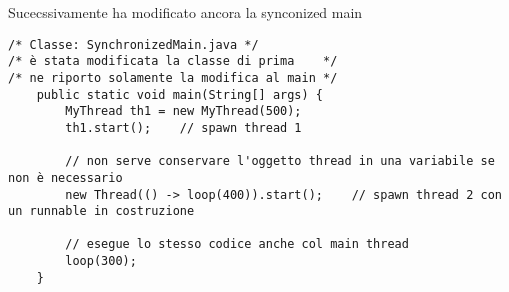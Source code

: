 \noindent Sucecssivamente ha modificato ancora la synconized main

\begin{lstlisting}[basicstyle=\small,]
/* Classe: SynchronizedMain.java */
/* è stata modificata la classe di prima    */
/* ne riporto solamente la modifica al main */
    public static void main(String[] args) {
        MyThread th1 = new MyThread(500);
        th1.start();    // spawn thread 1

        // non serve conservare l'oggetto thread in una variabile se non è necessario
        new Thread(() -> loop(400)).start();    // spawn thread 2 con un runnable in costruzione

        // esegue lo stesso codice anche col main thread
        loop(300);  
    }

\end{lstlisting}










